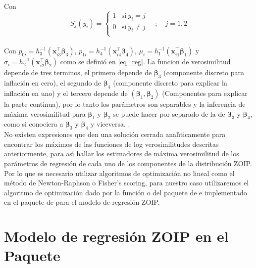 Con
\[
S_j(y_i)=
\begin{cases}
1 & \text{si}\ y_i=j\\
0 & \text{si}\ y_i\neq j\\
\end{cases}
\quad ; \quad j=1,2
\]
\\
Con $p_{0i}=h_3^{-1}(\mathbf{x}_{i3}^{\top} \boldsymbol{\beta}_3)$, $p_{1i}=h_4^{-1}(\mathbf{x}_{i4}^{\top} \boldsymbol{\beta}_4)$, $\mu_i=h_1^{-1}(\mathbf{x}_{i1}^{\top} \boldsymbol{\beta}_1)$ y $\sigma_i=h_2^{-1}(\mathbf{x}_{i2}^{\top} \boldsymbol{\beta}_2)$ como se defini\'{o} en \eqref{eq_reg}. La funcion de verosimilitud depende de tres terminos, el primero depende de $\boldsymbol{\beta}_3$ (componente discreto para inflaci\'{o}n en cero), el segundo de $\boldsymbol{\beta}_4$ (componente discreto para explicar la inflaci\'{o}n en uno) y el tercero depende de $(\boldsymbol{\beta}_1,\boldsymbol{\beta}_2)$ (Componentes para explicar la parte continua), por lo tanto los par\'{a}metros son separables y la inferencia de m\'{a}xima verosimilitud para $\boldsymbol{\beta}_1$ y $\boldsymbol{\beta}_2$ se puede hacer por separado de la de $\boldsymbol{\beta}_3$ y $\boldsymbol{\beta}_4$, como si conociera a $\boldsymbol{\beta}_3$ y $\boldsymbol{\beta}_4$ y viceversa. \citep{Ospina1}.\\

No existen expresiones que den una soluci\'{o}n cerrada anal\'{\i}ticamente para encontrar los m\'{a}ximos de las funciones de log verosimilitudes descritas anteriormente, para as\'{\i} hallar los estimadores de m\'{a}xima verosimilitud de los par\'{a}metros de regresi\'{o}n de cada uno de los componentes de la distribuci\'{o}n ZOIP. Por lo que es necesario utilizar algoritmos de optimizaci\'{o}n no lineal como el m\'{e}todo de Newton-Raphson o Fisher's scoring, para nuestro caso utilizaremos el algoritmo de optimizaci\'{o}n dado por la funci\'{o}n  o  del paquete  de  e implementado en el paquete  de  para el modelo de regresi\'{o}n ZOIP.


\section{Modelo de regresi\'{o}n ZOIP en el Paquete }

